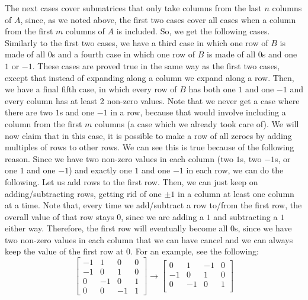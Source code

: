 \documentclass{article}
\begin{document}
\begin{description}
        The next cases cover submatrices that only take columns from the last
        $n$ columns of $A$, since, as we noted above, the first two cases cover
        all cases when a column from the first $m$ columns of $A$ is included.
        So, we get the following cases. Similarly to the first two cases, we
        have a third case in which one row of $B$ is made of all $0$s and a
        fourth case in which one row of $B$ is made of all $0$s and one
        $1$ or $-1$. These cases are proved true in the same way as the first
        two cases, except that instead of expanding along a column we expand
        along a row. Then, we have a final fifth case, in which every row of $B$ has
        both one $1$ and one $-1$ and every column has at least 2 non-zero
        values. Note that we never get a case where there are
        two $1$s and one $-1$ in a row, because that would involve including a
        column from the first $m$ columns (a case which we already took care of).
        We will now claim that in this case, it is possible to make a row of
        all zeroes by adding multiples of rows to other rows. We
        can see this is true because of the following reason. Since we have two
        non-zero values in each column (two $1$s, two $-1$s, or
        one $1$ and one $-1$) and exactly one $1$ and one $-1$ in each row,
        we can do the following. Let us add rows to the
        first row. Then, we can just keep on adding/subtracting rows, getting rid of one
        $\pm1$ in a column at least one column at a time. Note that, every time we
        add/subtract a row to/from the first row, the overall value of that row
        stays 0, since we are adding a $1$ and subtracting a $1$ either
        way. Therefore, the first row will eventually become all $0$s,
        since we have two non-zero values in each column that we can have cancel
        and we can always keep the value of the first row at $0$.
        For an example, see the following:
        \[
        \begin{bmatrix}
        -1 & 1 & 0 & 0\\
        -1 & 0 & 1 & 0\\
         0 & -1 & 0 & 1\\
         0 & 0 & -1 & 1
        \end{bmatrix} \rightarrow
        \begin{bmatrix}
         0 & 1 & -1 & 0\\
        -1 & 0 & 1 & 0\\
         0 & -1 & 0 & 1\\

\end{bmatrix}\]
\end{description}
\end{document}
